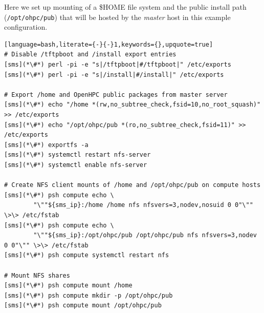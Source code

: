 Here we set up \NFS{}  mounting of a
\$HOME file system and the public \OHPC{} install path (\texttt{/opt/ohpc/pub})
that will be hosted by the {\em master} host in this  example configuration.

\begin{lstlisting}[language=bash,literate={-}{-}1,keywords={},upquote=true]
# Disable /tftpboot and /install export entries
[sms](*\#*) perl -pi -e "s|/tftpboot|#/tftpboot|" /etc/exports
[sms](*\#*) perl -pi -e "s|/install|#/install|" /etc/exports

# Export /home and OpenHPC public packages from master server
[sms](*\#*) echo "/home *(rw,no_subtree_check,fsid=10,no_root_squash)" >> /etc/exports
[sms](*\#*) echo "/opt/ohpc/pub *(ro,no_subtree_check,fsid=11)" >> /etc/exports
[sms](*\#*) exportfs -a
[sms](*\#*) systemctl restart nfs-server
[sms](*\#*) systemctl enable nfs-server

# Create NFS client mounts of /home and /opt/ohpc/pub on compute hosts
[sms](*\#*) psh compute echo \
        "\""${sms_ip}:/home /home nfs nfsvers=3,nodev,nosuid 0 0"\"" \>\> /etc/fstab
[sms](*\#*) psh compute echo \
        "\""${sms_ip}:/opt/ohpc/pub /opt/ohpc/pub nfs nfsvers=3,nodev 0 0"\"" \>\> /etc/fstab
[sms](*\#*) psh compute systemctl restart nfs

# Mount NFS shares
[sms](*\#*) psh compute mount /home
[sms](*\#*) psh compute mkdir -p /opt/ohpc/pub
[sms](*\#*) psh compute mount /opt/ohpc/pub

\end{lstlisting}

